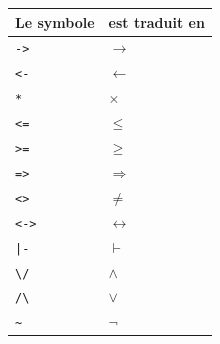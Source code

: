   \begin{center}
    \begin{tabular}{|l|l|}
      \hline
      Le symbole & est traduit en                   \\ \hline
      \texttt{->}              & $\rightarrow$      \\ \hline
      \texttt{<-}              & $\leftarrow$       \\ \hline
      \texttt{*}               & $\times$           \\ \hline
      \texttt{<=}              & $\leq$             \\ \hline
      \texttt{>=}              & $\geq$             \\ \hline
      \texttt{=>}              & $\Rightarrow$      \\ \hline
      \texttt{<>}              & $\neq$             \\ \hline
      \texttt{<->}             & $\leftrightarrow$  \\ \hline
      \texttt{|-}              & $\vdash$           \\ \hline
      \texttt{\textbackslash/} & $\land$            \\ \hline
      \texttt{/\textbackslash} & $\lor$             \\ \hline
      \texttt{\~}              & $\lnot$            \\ \hline
    \end{tabular}
    \label{trad.coqdoc}
  \end{center}
  \clearpage{}
